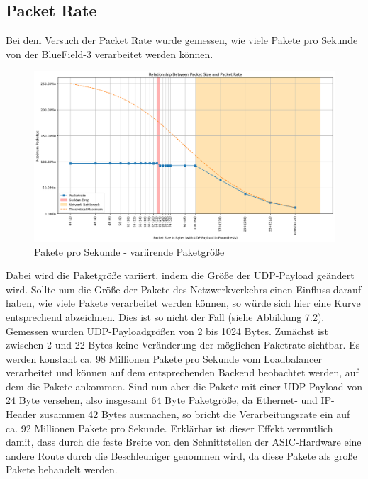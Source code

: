 \subsection{Packet Rate}
Bei dem Versuch der Packet Rate wurde gemessen, wie viele Pakete pro Sekunde von der BlueField-3 verarbeitet werden können.
\begin{figure}
    \centering
    \includegraphics[width=1\linewidth]{images/pps_pps.png}
    \caption{Pakete pro Sekunde - variirende Paketgröße}
    \label{fig:enter-label}
\end{figure}
Dabei wird die Paketgröße variiert, indem die Größe der UDP-Payload geändert wird. Sollte nun die Größe der Pakete des Netzwerkverkehrs einen Einfluss darauf haben, wie viele Pakete verarbeitet werden können, so würde sich hier eine Kurve entsprechend abzeichnen. Dies ist so nicht der Fall (siehe Abbildung 7.2). Gemessen wurden UDP-Payloadgrößen von 2 bis 1024 Bytes. Zunächst ist zwischen 2 und 22 Bytes keine Veränderung der möglichen Paketrate sichtbar. Es werden konstant ca. 98 Millionen Pakete pro Sekunde vom Loadbalancer verarbeitet und können auf dem entsprechenden Backend beobachtet werden, auf dem die Pakete ankommen. Sind nun aber die Pakete mit einer UDP-Payload von 24 Byte versehen, also insgesamt 64 Byte Paketgröße, da Ethernet- und IP-Header zusammen 42 Bytes ausmachen, so bricht die Verarbeitungsrate ein auf ca. 92 Millionen Pakete pro Sekunde. Erklärbar ist dieser Effekt vermutlich damit, dass durch die feste Breite von den Schnittstellen der ASIC-Hardware eine andere Route durch die Beschleuniger genommen wird, da diese Pakete als große Pakete behandelt werden.

